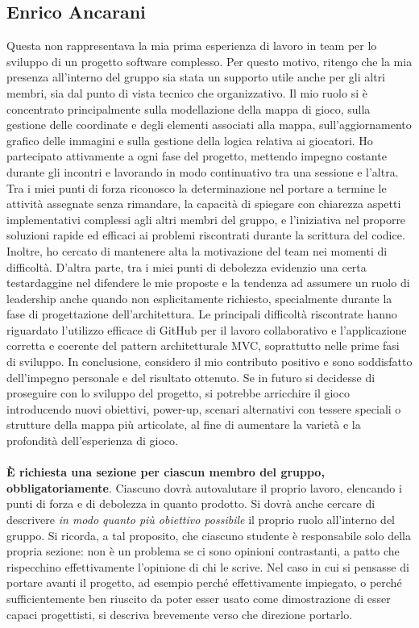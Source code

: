 \documentclass[a4paper,12pt]{report}
\begin{document}
\subsection{Enrico Ancarani}
Questa non rappresentava la mia prima esperienza di lavoro in team per lo sviluppo di un progetto software complesso. 
Per questo motivo, ritengo che la mia presenza all'interno del gruppo sia stata un supporto utile anche per gli altri membri, sia dal punto di vista tecnico che organizzativo.
Il mio ruolo si è concentrato principalmente sulla modellazione della mappa di gioco, sulla gestione delle coordinate e degli elementi associati alla mappa, 
sull’aggiornamento grafico delle immagini e sulla gestione della logica relativa ai giocatori. Ho partecipato attivamente a ogni fase del progetto, mettendo impegno 
costante durante gli incontri e lavorando in modo continuativo tra una sessione e l’altra.
Tra i miei punti di forza riconosco la determinazione nel portare a termine le attività assegnate senza rimandare, la capacità di spiegare con chiarezza aspetti 
implementativi complessi agli altri membri del gruppo, e l'iniziativa nel proporre soluzioni rapide ed efficaci ai problemi riscontrati durante la scrittura del codice. 
Inoltre, ho cercato di mantenere alta la motivazione del team nei momenti di difficoltà.
D’altra parte, tra i miei punti di debolezza evidenzio una certa testardaggine nel difendere le mie proposte e la tendenza ad assumere un ruolo di leadership anche 
quando non esplicitamente richiesto, specialmente durante la fase di progettazione dell’architettura.
Le principali difficoltà riscontrate hanno riguardato l’utilizzo efficace di GitHub per il lavoro collaborativo e l’applicazione corretta e coerente del pattern 
architetturale MVC, soprattutto nelle prime fasi di sviluppo.
In conclusione, considero il mio contributo positivo e sono soddisfatto dell’impegno personale e del risultato ottenuto. 
Se in futuro si decidesse di proseguire con lo sviluppo del progetto, si potrebbe arricchire il gioco introducendo nuovi obiettivi, 
power-up, scenari alternativi con tessere speciali o strutture della mappa più articolate, al fine di aumentare la varietà e la profondità dell’esperienza di gioco.
\\
\\
\textbf{È richiesta una sezione per ciascun membro del gruppo, obbligatoriamente}.
%
Ciascuno dovrà autovalutare il proprio lavoro, elencando i punti di forza e di debolezza in quanto prodotto.
Si dovrà anche cercare di descrivere \emph{in modo quanto più obiettivo possibile} il proprio ruolo all'interno del gruppo.
Si ricorda, a tal proposito, che ciascuno studente è responsabile solo della propria sezione: non è un problema se ci sono opinioni contrastanti, a patto che rispecchino effettivamente l'opinione di chi le scrive.
Nel caso in cui si pensasse di portare avanti il progetto, ad esempio perché effettivamente impiegato, o perché sufficientemente ben riuscito da poter esser usato come dimostrazione di esser capaci progettisti, si descriva brevemente verso che direzione portarlo.
\end{document}
